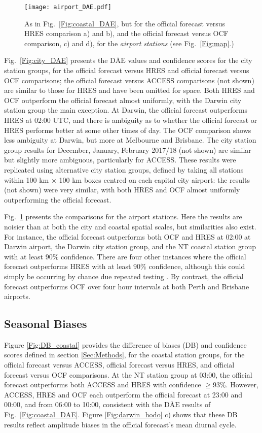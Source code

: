 \documentclass{ametsoc}
\begin{document}
\begin{figure}
\centering
\texttt{[image: airport\_DAE.pdf]}
\caption{As in Fig.~\ref{Fig:coastal_DAE}, but for the official forecast versus HRES comparison a) and b), and the official forecast versus OCF comparison, c) and d), for the \textit{airport stations} (see Fig.~\ref{Fig:map}.)}
\label{Fig:airport_DAE}
\end{figure}

Fig.~\ref{Fig:city_DAE} presents the $\overline{\text{DAE}}$ values and confidence scores for the city station groups, for the official forecast versus HRES and official forecast versus OCF comparisons; the official forecast versus ACCESS comparisons (not shown) are similar to those for HRES and have been omitted for space. Both HRES and OCF outperform the official forecast almost uniformly, with the Darwin city station group the main exception. At Darwin, the official forecast outperforms HRES at 02:00 UTC, and there is ambiguity as to whether the official forecast or HRES performs better at some other times of day. The OCF comparison shows less ambiguity at Darwin, but more at Melbourne and Brisbane. The city station group results for December, January, February 2017/18 (not shown) are similar but slightly more ambiguous, particularly for ACCESS. These results were replicated using alternative city station groups, defined by taking all stations within 100 km $\times$ 100 km boxes centred on each capital city airport: the results (not shown) were very similar, with both HRES and OCF almost uniformly outperforming the official forecast.  

Fig.~\ref{Fig:airport_DAE} presents the comparisons for the airport stations. Here the results are noisier than at both the city and coastal spatial scales, but similarities also exist. For instance, the official forecast outperforms both OCF and HRES at 02:00 at Darwin airport, the Darwin city station group, and the NT coastal station group with at least $90\%$ confidence. There are four other instances where the official forecast outperforms HRES with at least $90\%$ confidence, although this could simply be occurring by chance due repeated testing \citep[p. 178]{wilks11}. By contrast, the official forecast outperforms OCF over four hour intervals at both Perth and Brisbane airports.

\subsection{Seasonal Biases}
\label{Sec:Seasonal}
Figure \ref{Fig:DB_coastal} provides the difference of biases (DB) and confidence scores defined in section \ref{Sec:Methods}, for the coastal station groups, for the official forecast versus ACCESS, official forecast versus HRES, and official forecast versus OCF comparisons. At the NT station group at 03:00, the official forecast outperforms both ACCESS and HRES with confidence $\geq 93\%$. However, ACCESS, HRES and OCF each outperform the official forecast at 23:00 and 00:00, and from 06:00 to 10:00, consistent with the $\overline{\text{DAE}}$ results of Fig.~\ref{Fig:coastal_DAE}. Figure \ref{Fig:darwin_hodo} c) shows that these DB results reflect amplitude biases in the official forecast's mean diurnal cycle.
\end{document}
